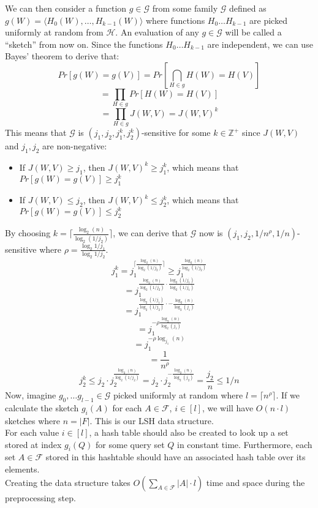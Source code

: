 We can then consider a function $g \in \mathcal{G}$ from some family $\mathcal{G}$ defined as $g(W) = \langle H_0(W), \dots, H_{k-1}(W) \rangle$ where functions $H_0 \dots H_{k-1}$ are picked uniformly at random from $\mathcal{H}$. An evaluation of any $g\in \mathcal{G}$ will be called a ``sketch'' from now on. Since the functions $H_0 \dots H_{k-1}$ are independent, we can use Bayes' theorem to derive that:
$$Pr[g(W)=g(V)] = Pr[\bigcap_{H \in g}H(W) = H(V)]$$
$$=\prod_{H\in g}Pr[H(W) = H(V)]$$
$$=\prod_{H\in g}J(W,V)=J(W,V)^k$$
This means that $\mathcal{G}$ is $(j_1, j_2, j_1^k, j_2^k)$-sensitive for some $k\in \mathbb{Z}^+$ since $J(W,V)$ and $j_1, j_2$ are non-negative:
\begin{itemize}
    \item If $J(W,V) \geq j_1$, then $J(W,V)^k \geq j_1^k$, which means that $Pr[g(W)=g(V)] \geq j_1^k$
    \item If $J(W,V) \leq j_2$, then $J(W,V)^k \leq j_2^k$, which means that $Pr[g(W)=g(V)] \leq j_2^k$
\end{itemize}
By choosing $k=\lceil \frac{\log_2(n)}{\log_2(1/j_2)} \rceil$, we can derive that $\mathcal{G}$ now is $(j_1, j_2, 1/n^\rho, 1/n)$-sensitive where $\rho=\frac{\log_2{1/j_1}}{\log_2{1/j_2}}$.
$$j_1^k = j_1^{\lceil\frac{\log_2(n)}{\log_2(1/j_2)} \rceil}\geq j_1^{\frac{\log_2(n)}{\log_2(1/j_2)}}$$
$$=j_1^{\frac{\log_2{(n)}}{\log_2{(1/j_2)}}\cdot\frac{\log_2{(1/j_1)}}{\log_2{(1/j_1)}}}$$
$$=j_1^{\frac{\log_2{(1/j_1)}}{\log_2{(1/j_2)}}\cdot-\frac{\log_2{(n)}}{\log_2{(j_1)}}}$$
$$=j_1^{-\rho\frac{\log_2{(n)}}{\log_2{(j_1)}}}$$
$$=j_1^{-\rho\log_{j_1}{(n)}}$$
$$=\frac{1}{n^\rho}$$
$$j_2^k\leq j_2 \cdot j_2^{\frac{\log_2(n)}{\log_2(1/j_2)}}=j_2\cdot j_2^{-\frac{\log_2{(n)}}{\log_2{(j_2)}}}=\frac{j_2}{n}\leq 1/n$$
Now, imagine $g_0, \dots g_{l-1} \in \mathcal{G}$ picked uniformly at random where $l=\lceil n^\rho \rceil$. If we calculate the sketch $g_i(A)$ for each $A\in \mathcal{F}$, $i\in [l]$, we will have $O(n\cdot l)$ sketches where $n=|F|$. This is our LSH data structure. \\
For each value $i\in [l]$, a hash table should also be created to look up a set stored at index $g_i(Q)$ for some query set $Q$ in constant time.
Furthermore, each set $A\in \mathcal{F}$ stored in this hashtable should have an associated hash table over its elements.\\
Creating the data structure takes $O(\sum_{A\in \mathcal{F}}|A| \cdot l)$ time and space during the preprocessing step.\\

